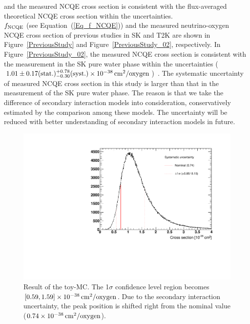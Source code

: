 and the measured NCQE cross section is consistent with the flux-averaged theoretical NCQE cross section within the uncertainties.\\
\hs
$f_{\rm NCQE}$ (see Equation~(\ref{Eq_f_NCQE})) and the measured neutrino-oxygen NCQE cross section of previous studies in SK and T2K are shown in Figure~\ref{PreviousStudy} and Figure~\ref{PreviousStudy_02}, respectively.
In Figure~\ref{PreviousStudy_02}, the measured NCQE cross section is consistent with the measurement in the SK pure water phase within the uncertainties ($1.01 \pm 0.17 ({\rm stat.})^{+0.78}_{-0.30}({\rm syst.}) \times 10^{-38}\,{\rm cm}^{2}/{\rm oxygen}$)~\cite{2019Linyan}.
The systematic uncertainty of measured NCQE cross section in this study is larger than that in the measurement of the SK pure water phase.
The reason is that we take the difference of secondary interaction models into consideration, conservatively estimated by the comparison among these models.
The uncertainty will be reduced with better understanding of secondary interaction models in future.

\begin{figure}[p]
	\centering
	\includegraphics[width=12cm]{PDF/ToyMC/ToyMC}
	\caption[Result of the toy-MC]{
	Result of the toy-MC.
	The 1$\sigma$ confidence level region becomes $[0.59, 1.59] \times 10^{-38}\,{\rm cm}^{2}/{\rm oxygen}$.
	Due to the secondary interaction uncertainty, the peak position is shifted right from the nominal value ($0.74 \times 10^{-38}\,{\rm cm}^{2}/{\rm oxygen}$).
	}\label{ToyMC}
\end{figure}

